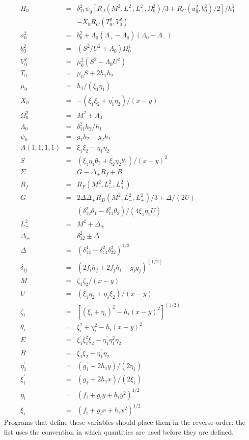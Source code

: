 \documentclass[12pt]{article}
\begin{document}
\begin{eqnarray*}
  H_0 & = &  \delta_{11}^2\psi_0 [
			R_J(M^2,L_{-}^2,L_{+}^2,\Omega_0^2)/3
			+R_C(a_0^2,b_0^2)/2]/h_1^2 \\
	&  &		-X_0R_C(T_0^2,V_0^2) \\
  a_0^2 & = & b_0^2 + \Lambda_0(\Lambda_{+} - \Lambda_0)
			(\Lambda_0 - \Lambda_{-}) \\
  b_0^2 & = &  (S^2/U^2 + \Lambda_0)\Omega_0^4 \\
  V_0^2 & = & \mu_0^2(S^2 + \Lambda_0U^2)  \\
  T_0 & = & \mu_0S + 2h_1h_2  \\
  \mu_0 & = & h_1/(\xi_1\eta_1)  \\
  X_0 & = & -(\xi_1^\prime\xi_2 + \eta_1^\prime\eta_2)/(x-y) \\
  \Omega_0^2 & = & M^2 + \Lambda_0  \\
  \Lambda_0 & = &  \delta_{11}^2h_2/h_1 \\
  \psi_0 & = & g_1h_2 - g_2h_1 \\
  A(1,1,1,1) & = & \xi_1\xi_2 - \eta_1\eta_2  \\
  S & = & (\xi_1\eta_1\theta_2 + \xi_2\eta_2\theta_1)/(x-y)^2 \\
  \Sigma & = & G-\Delta_{+}R_f + B  \\
  R_f & = & R_F(M^2,L_{-}^2, L_{+}^2)  \\
  G & = & 2\Delta\Delta_{+}R_D(M^2,L_{-}^2,L_{+}^2)/3 + \Delta/(2U) \\
    & &	 (\delta_{12}^2\theta_1 - \delta_{11}^2\theta_2)/(4\xi_1\eta_1U) \\
  L_{\pm}^2 & = & M^2 + \Delta_{\pm}  \\
  \Delta_{\pm} & = & \delta_{12}^2 \pm \Delta \\
  \Delta &=& (\delta_{12}^4 -\delta_{11}^2\delta_{22}^2)^{1/2} \\
  \delta_{ij} & = & (2f_ih_j + 2f_jh_i - g_ig_j)^{(1/2)}  \\
  M & = & \zeta_1\zeta_2/(x - y) \\
  U & = & (\xi_1\eta_2+\eta_1\xi_2)/(x - y)  \\
  \zeta_i & = & [(\xi_i+\eta_i)^2 - h_i(x-y)^2]^{(1/2)} \\
  \theta_i & = & \xi_i^2 + \eta_i^2 - h_i(x-y)^2  \\
  E & = & \xi_1^\prime\xi_1^2\xi_2-\eta_1^\prime\eta_1^2\eta_2 \\
  B & = & \xi_1^\prime\xi_2 - \eta_1^\prime\eta_2 \\
  \eta_1^\prime & = & (g_1 + 2h_1y)/(2\eta_1)  \\
  \xi_1^\prime & = & (g_1 + 2h_1x)/(2\xi_1)  \\
  \eta_i& = & (f_i + g_iy + h_iy^2)^{1/2}  \\
  \xi_i & = & (f_i + g_ix + h_ix^2)^{1/2}
\end{eqnarray*}
Programs that define these variables should place them in the
reverse order: the list uses the convention in which quantities
are used before they are defined.
\end{document}
